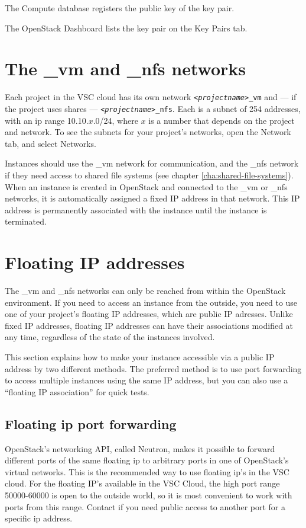 The Compute database registers the public key of the key pair.

The \gls{OpenStack Dashboard} lists the key pair on the Key Pairs tab.

\section{The \_vm and \_nfs networks}\label{sec:_vm-_nfs-networks}
Each project in the VSC cloud has its own network
\texttt{\emph{<projectname>}\_vm} and --- if the project uses shares
--- \texttt{\emph{<projectname>}\_nfs}.   Each is a subnet of 254
addresses, with an ip range 10.10.$x$.0/24, where $x$ is a number that
depends on the project and network.  To see the subnets for your
project's networks, open the Network tab, and select Networks.

Instances should use the \_vm network for communication, and the \_nfs
network if they need access to shared file systems (see chapter
\ref{cha:shared-file-systems}).  When an instance is created in
\gls{OpenStack} and connected to the \_vm or \_nfs networks, it is
automatically assigned a fixed IP address in that network. This IP
address is permanently associated with the instance until the instance
is terminated.

\section{Floating IP addresses}\label{sec:floating-ip}
The \_vm and \_nfs networks can only be reached from within the
OpenStack environment.  If you need to access an instance from the
outside, you need to use one of your project's floating IP addresses,
which are public IP adresses.  Unlike fixed IP addresses, floating IP
addresses can have their associations modified at any time, regardless
of the state of the instances involved.

This section explains how to make your instance accessible via a
public IP address by two different methods.  The preferred method is
to use port forwarding to access multiple instances using the same IP
address, but you can also use a ``floating IP association'' for quick
tests.

\subsection*{Floating ip port forwarding}
OpenStack's networking API, called Neutron, makes it possible to
forward different ports of the same floating ip to arbitrary ports in
one of OpenStack's virtual networks.  This is the recommended way to
use floating ip's in the VSC cloud.  For the floating IP's available
in the VSC Cloud, the high port range 50000-60000 is open to the
outside world, so it is most convenient to work with ports from this
range.  Contact \cloudinfo if you need public access to another port
for a specific ip address.

